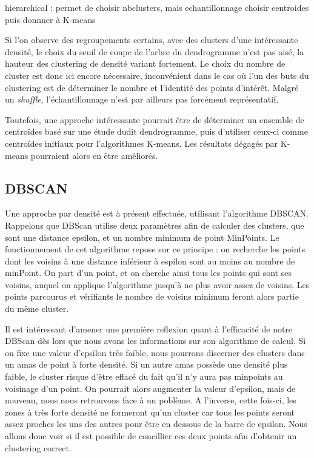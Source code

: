 hierarchical : permet de choisir nbclusters, mais echantillonnage
choisir centroides puis donnner à K-means

Si l'on observe des regroupements certains, avec des clusters d'une intéressante densité, le choix du seuil de coupe de l'arbre du dendrogramme n'est pas aisé, la hauteur des clustering de densité variant fortement.
Le choix du nombre de cluster est donc ici encore nécessaire, inconvénient dans le cas où l'un des buts du clustering est de déterminer le nombre et l'identité des points d'intérêt. Malgré un \textit{shuffle}, l'échantillonnage n'est par ailleurs pas forcément représentatif.

Toutefois, une approche intéressante pourrait être de déterminer un ensemble de centroïdes basé sur une étude dudit dendrogramme, puis d'utiliser ceux-ci comme centroïdes initiaux pour l'algorithmes K-means. Les résultats dégagés par K-means pourraient alors en être améliorés.
\pagebreak



\subsection{DBSCAN}
Une approche par densité est à présent effectuée, utilisant l'algorithme DBSCAN.
Rappelons que DBScan utilise deux paramètres afin de calculer des clusters, que sont une distance epsilon, et un nombre minimum de point MinPoints. Le fonctionnement de cet algorithme repose sur ce principe : on recherche les points dont les voisins à une distance inférieur à espilon sont au moins au nombre de minPoint. On part d'un point, et on cherche ainsi tous les points qui sont ses voisins, auquel on applique l'algorithme jusqu'à ne plus avoir assez de voisins. Les points parcourus et vérifiants le nombre de voisins minimum feront alors partie du même cluster.

Il est intéressant d'amener une première reflexion quant à l'efficacité de notre DBScan dès lors que nous avons les informations sur son algorithme de calcul. Si on fixe une valeur d'epsilon très faible, nous pourrons discerner des clusters dans un amas de point à forte densité. Si un autre amas possède une densité plus faible, le cluster risque d'être effacé du fait qu'il n'y aura pas minpoints au voisinage d'un point. On pourrait alors augmenter la valeur d'epsilon, mais de nouveau, nous nous retrouvons face à un poblème. A l'inverse, cette fois-ci, les zones à très forte densité ne formeront qu'un cluster car tous les points seront assez proches les uns des autres pour être en dessous de la barre de epsilon.
Nous allons donc voir si il est possible de concillier ces deux points afin d'obtenir un clustering correct. 

